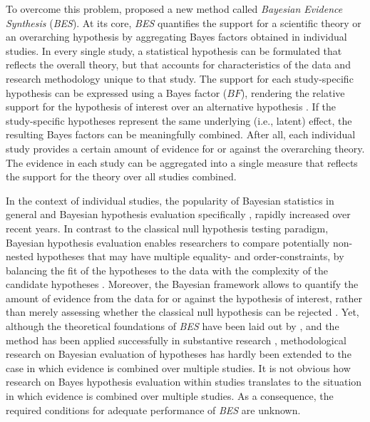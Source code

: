 \documentclass[review, 3p, authoryear]{elsarticle} %
\begin{document}
To overcome this problem, \citet{kuiper_combining_2013} proposed a new method called \emph{Bayesian Evidence Synthesis} (\emph{BES}).
At its core, \emph{BES} quantifies the support for a scientific theory or an overarching hypothesis by aggregating Bayes factors obtained in individual studies.
In every single study, a statistical hypothesis can be formulated that reflects the overall theory, but that accounts for characteristics of the data and research methodology unique to that study.
The support for each study-specific hypothesis can be expressed using a Bayes factor (\(BF\)), rendering the relative support for the hypothesis of interest over an alternative hypothesis \citep{kass_raftery_bayes_factors_1995}.
If the study-specific hypotheses represent the same underlying (i.e., latent) effect, the resulting Bayes factors can be meaningfully combined.
After all, each individual study provides a certain amount of evidence for or against the overarching theory.
The evidence in each study can be aggregated into a single measure that reflects the support for the theory over all studies combined.

In the context of individual studies, the popularity of Bayesian statistics in general \citep[e.g.,][]{lynch_bayesian_2019} and Bayesian hypothesis evaluation specifically \citep{vandeschoot_systematic_2017}, rapidly increased over recent years.
In contrast to the classical null hypothesis testing paradigm, Bayesian hypothesis evaluation enables researchers to compare potentially non-nested hypotheses that may have multiple equality- and order-constraints, by balancing the fit of the hypotheses to the data with the complexity of the candidate hypotheses \citep{klugkist_inequality_2005, hoijtink2019tutorial}.
Moreover, the Bayesian framework allows to quantify the amount of evidence from the data for or against the hypothesis of interest, rather than merely assessing whether the classical null hypothesis can be rejected \citep{Wagenmakers_bayesian_2018}.
Yet, although the theoretical foundations of \emph{BES} have been laid out by \citet{kuiper_combining_2013}, and the method has been applied successfully in substantive research \citep[e.g.,][]{kevenaar_bes_2021, zondervan_parental_2019, zondervan_robust_2020, volker_cooperation_2022}, methodological research on Bayesian evaluation of hypotheses has hardly been extended to the case in which evidence is combined over multiple studies.
It is not obvious how research on Bayes hypothesis evaluation within studies translates to the situation in which evidence is combined over multiple studies.
As a consequence, the required conditions for adequate performance of \emph{BES} are unknown.
\end{document}
